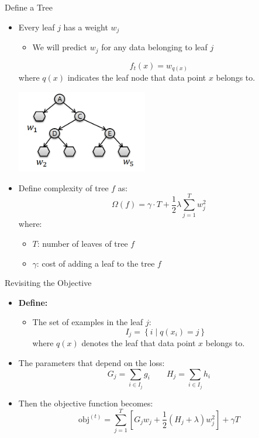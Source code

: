 \begin{frame}[allowframebreaks]{Define a Tree}
\begin{itemize}
    \item Every leaf \( j \) has a weight \( w_j \)
    \begin{itemize}
        \item We will predict \( w_j \) for any data belonging to leaf \( j \)
    \end{itemize}

    \[
        f_t(x) = w_{q(x)}
    \]
    where \( q(x) \) indicates the leaf node that data point \( x \) belongs to.

    \begin{center}
        \includegraphics[width=0.45\textwidth]{images/decision-trees/decision-trees-17.png}
    \end{center}

    \item Define complexity of tree \( f \) as:
    \[
        \Omega(f) = \gamma \cdot T + \frac{1}{2} \lambda \sum_{j=1}^{T} w_j^2
    \]
    where:
    \begin{itemize}
        \item \( T \): number of leaves of tree \( f \)
        \item \( \gamma \): cost of adding a leaf to the tree \( f \)
    \end{itemize}
\end{itemize}
\end{frame}


\begin{frame}{Revisiting the Objective}
\begin{itemize}
    \item \textbf{Define:}
    \begin{itemize}
        \item The set of examples in the leaf \( j \):
        \[
            I_j = \left\{ i \mid q(x_i) = j \right\}
        \]
        where \( q(x) \) denotes the leaf that data point \( x \) belongs to.
    \end{itemize}

    \item The parameters that depend on the loss:
    \[
        G_j = \sum_{i \in I_j} g_i \qquad H_j = \sum_{i \in I_j} h_i
    \]

    \item Then the objective function becomes:
    \[
        \text{obj}^{(t)} = \sum_{j=1}^{T} \left[ G_j w_j + \frac{1}{2}(H_j + \lambda) w_j^2 \right] + \gamma T
    \]
\end{itemize}
\end{frame}


